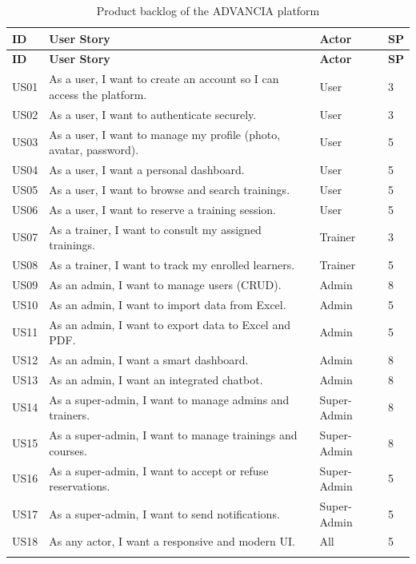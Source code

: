 \begin{longtable}{|>{\columncolor{softblue}}p{0.9cm}|p{8.5cm}|p{2.3cm}|p{1.1cm}|}
\hline
\rowcolor{primary}
\textbf{\color{white} ID} & \textbf{\color{white} User Story} & \textbf{\color{white} Actor} & \textbf{\color{white} SP}\\
\hline
\endfirsthead
\hline
\rowcolor{primary}
\textbf{\color{white} ID} & \textbf{\color{white} User Story} & \textbf{\color{white} Actor} & \textbf{\color{white} SP}\\
\hline
\endhead
US01 & As a user, I want to create an account so I can access the platform. & User & 3 \\\hline
US02 & As a user, I want to authenticate securely. & User & 3 \\\hline
US03 & As a user, I want to manage my profile (photo, avatar, password). & User & 5 \\\hline
US04 & As a user, I want a personal dashboard. & User & 5 \\\hline
US05 & As a user, I want to browse and search trainings. & User & 5 \\\hline
US06 & As a user, I want to reserve a training session. & User & 5 \\\hline
US07 & As a trainer, I want to consult my assigned trainings. & Trainer & 3 \\\hline
US08 & As a trainer, I want to track my enrolled learners. & Trainer & 5 \\\hline
US09 & As an admin, I want to manage users (CRUD). & Admin & 8 \\\hline
US10 & As an admin, I want to import data from Excel. & Admin & 5 \\\hline
US11 & As an admin, I want to export data to Excel and PDF. & Admin & 5 \\\hline
US12 & As an admin, I want a smart dashboard. & Admin & 8 \\\hline
US13 & As an admin, I want an integrated chatbot. & Admin & 8 \\\hline
US14 & As a super-admin, I want to manage admins and trainers. & Super-Admin & 8 \\\hline
US15 & As a super-admin, I want to manage trainings and courses. & Super-Admin & 8 \\\hline
US16 & As a super-admin, I want to accept or refuse reservations. & Super-Admin & 5 \\\hline
US17 & As a super-admin, I want to send notifications. & Super-Admin & 5 \\\hline
US18 & As any actor, I want a responsive and modern UI. & All & 5 \\\hline
\caption{Product backlog of the ADVANCIA platform}
\label{tab:backlog}
\end{longtable}

